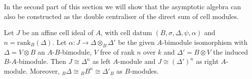 \documentclass[oneside, a4paper, 11pt]{amsart}
\newcommand{\asym}{\widehat{A}}
\newcommand{\rank}{\mathrm{rank}}
\begin{document}


In the second part of this section we will show that the asymptotic algebra can also be constructed as the double centraliser of the direct sum of cell modules. 

Let $J$ be an affine cell ideal of $A$, with cell datum $(B,\sigma,\Delta, \psi,\alpha)$ and $n=\rank_B(\Delta)$. Let ${\alpha:J \to \Delta \otimes_B \Delta'}$ be the given $A$-bimodule isomorphism with $\Delta = V\otimes B$ an $A$-$B$-bimodule, $V$ free of rank $n$ over $k$ and $\Delta' = B\otimes V$ the induced $B$-$A$-bimodule. Then $J\cong \Delta^n$ as left $A$-module and $J \cong (\Delta')^n$ as right $A$-module. Moreover, ${_B\Delta} \cong  {_BB}^n \cong {\Delta'_B}$ as $B$-modules.
\end{document}
